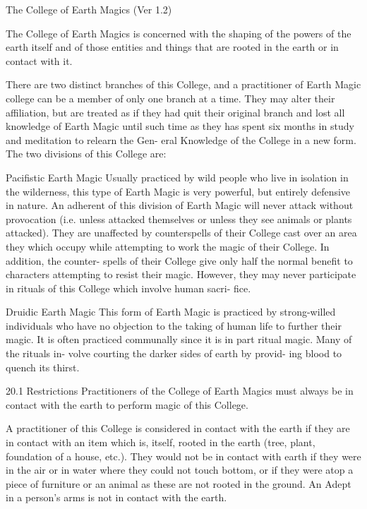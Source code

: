 \begin{Chapter}{The College of Earth Magics (Ver 1.2)}

The College of Earth Magics is concerned with the shaping of the
powers of the earth itself and of those entities and things that are
rooted in the earth or in contact with it.

There are two distinct branches of this College, and 
a  practitioner  of  Earth  Magic  college  can  be  a 
member  of  only  one  branch  at  a  time.  They  may 
alter  their affiliation, but  are  treated as  if  they  had 
quit their original branch and lost all knowledge of 
Earth  Magic  until  such  time  as  they  has  spent  six 
months in study and meditation to relearn the Gen-
eral Knowledge of the College in a new form. The 
two divisions of this College are: 

Pacifistic  Earth  Magic  Usually  practiced  by  wild 
people who live in isolation in the wilderness,  this 
type  of  Earth  Magic  is  very  powerful,  but  entirely 
defensive in nature. An adherent of this division of 
Earth Magic will never attack without provocation 
(i.e.  unless  attacked  themselves  or  unless  they  see 
animals or plants attacked). They are unaffected by 
counterspells  of  their  College  cast  over  an  area 
they  which  occupy  while  attempting  to  work  the 
magic  of  their  College.  In  addition,  the  counter-
spells  of  their  College  give  only  half  the  normal 
benefit  to  characters  attempting  to  resist  their 
magic.  However,  they  may  never  participate  in 
rituals  of  this College  which involve  human  sacri-
fice. 

Druidic  Earth  Magic  This  form  of  Earth  Magic  is 
practiced by strong-willed individuals who have no 
objection  to  the  taking  of  human  life  to  further 
their magic. It is often practiced communally since 
it  is  in  part  ritual  magic.  Many  of  the  rituals  in-
volve courting the darker sides of earth by provid-
ing blood to quench its thirst. 

20.1 Restrictions 
Practitioners  of  the  College  of  Earth  Magics  must 
always  be  in  contact  with  the  earth  to  perform 
magic of this College. 

A  practitioner  of  this  College  is  considered  in 
contact with the earth if they are in contact with an 
item which is, itself, rooted in the earth (tree, plant, 
foundation of a house, etc.). They  would not be in 
contact with earth if they were in the air or in water 
where they could not touch bottom, or if they were 
atop a  piece  of  furniture  or  an  animal  as  these  are 
not  rooted  in  the  ground.  An  Adept  in  a  person’s 
arms is not in contact with the earth. 


\end{Chapter}
